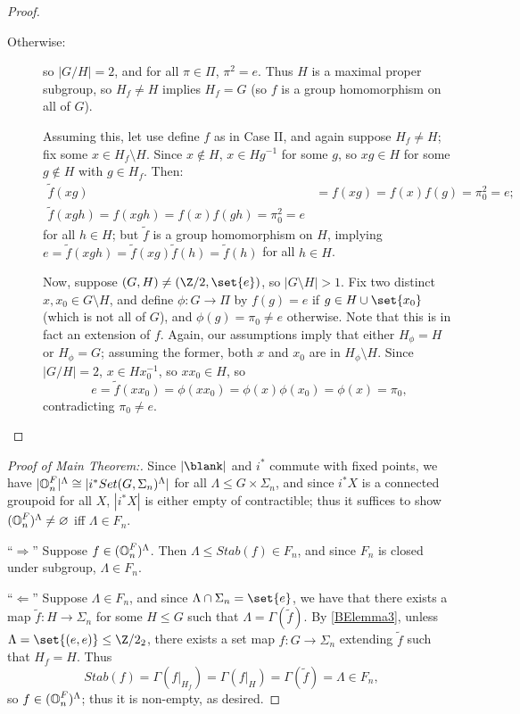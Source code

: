\documentclass{report}
\begin{document}
\begin{appendices}
\begin{proof}
\begin{description}
\item[Otherwise:] so $|G/H| = 2$, and for all $\pi\in\Pi$, $\pi^2=e$. Thus $H$ is a maximal proper subgroup, so $H_f\neq H$ implies $H_f = G$ (so $f$ is a group homomorphism on all of $G$). 

  Assuming this, let use define $f$ as in Case II, and again suppose $H_f\neq H$; fix some $x\in H_f\setminus H$. Since $x\notin H$, $x\in Hg^{-1}$ for some $g$, so $xg\in H$ for some $g\notin H$ with $g\in H_f$. Then:
  \begin{align*}
    \tilde f(xg) &= f(xg) = f(x)f(g) = \pi_0^2 = e;\\
    \tilde f(xgh) = f(xgh) = f(x)f(gh) = \pi_0^2 = e
  \end{align*}
for all $h\in H$; but $\tilde f$ is a group homomorphism on $H$, implying $e = \tilde f(xgh) = \tilde f(xg) \tilde f(h) = \tilde f(h)$ for all $h\in H$.

Now, suppose $(G,H)\neq (\Z/2, \set{e})$, so $|G\setminus H|>1$. Fix two distinct $x,x_0\in G\setminus H$, and define $\phi: G\to \Pi$ by $f(g) = e$ if $g\in H\cup\set{x_0}$ (which is not all of $G$), and $\phi(g) = \pi_0\neq e$ otherwise. Note that this is in fact an extension of $f$. Again, our assumptions imply that either $H_\phi = H$ or $H_\phi = G$; assuming the former, both $x$ and $x_0$ are in $H_\phi\setminus H$. Since $|G/H|=2$, $x\in Hx_0^{-1}$, so $xx_0\in H$, so 
\[e = \tilde f(xx_0) = \phi(xx_0) = \phi(x)\phi(x_0) = \phi(x) = \pi_0,\]
contradicting $\pi_0\neq e$.
  \end{description}
\end{proof}




\begin{proof}[Proof of Main Theorem:]

Since $|\blank |$ and $i^*$ commute with fixed points, we have $|\text{$\mathbb{O}$}^F_n|^\Lambda \cong |i^*Set(G,\Sigma_n)^\Lambda|$ for all $\Lambda\leq G\times \Sigma_n$, and since $i^*X$ is a connected groupoid for all $X$, $|i^*X|$ is either empty of contractible; thus it suffices to show $(\text{$\mathbb{O}$}_n^F)^\Lambda \neq \varnothing$ {\sc iff} $\Lambda\in F_n$. 

``$\Rightarrow$'' Suppose $f\in (\text{$\mathbb{O}$}_n^F)^\Lambda$. Then $\Lambda\leq Stab(f)\in F_n$, and since $F_n$ is closed under subgroup, $\Lambda\in F_n$.

``$\Leftarrow$'' Suppose $\Lambda\in F_n$, and since $\Lambda\cap \Sigma_n = \set{e}$, we have that there exists a map $\tilde f: H\to \Sigma_n$ for some $H\leq G$ such that $\Lambda = \Gamma(\tilde f)$. By \ref{BElemma3}, unless $\Lambda = \set{(e,e)}\leq \Z/2\time \Sigma_2$, there exists a set map $f: G\to \Sigma_n$ extending $\tilde f$ such that $H_f = H$. Thus
\[Stab(f) = \Gamma(f|_{H_f}) = \Gamma(f|_H) = \Gamma(\tilde f) = \Lambda\in F_n,\]
so $f\in (\text{$\mathbb{O}$}_n^F)^\Lambda$; thus it is non-empty, as desired.


\end{proof}
\end{appendices}
\end{document}
